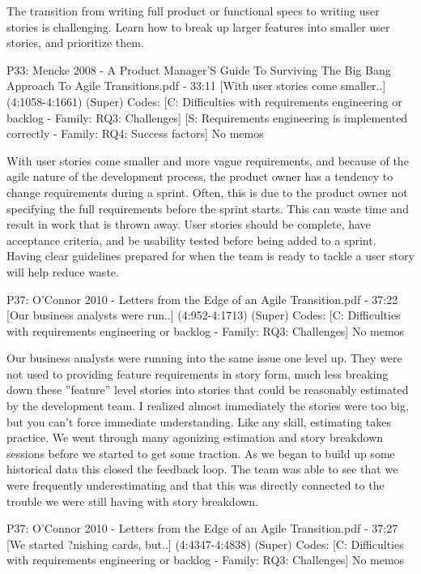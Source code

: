 \documentclass[preprint,authoryear,12pt]{elsarticle}
\begin{document}
The transition from writing full 
product or functional specs to writing user 
stories is challenging. Learn how to break up 
larger features into smaller user stories, and 
prioritize them.


P33: Mencke 2008 - A Product Manager'S Guide To Surviving The Big Bang Approach To Agile Transitions.pdf - 33:11 [With user stories come smaller..]  (4:1058-4:1661)   (Super)
Codes:	[C: Difficulties with requirements engineering or backlog - Family: RQ3: Challenges] [S: Requirements engineering is implemented correctly - Family: RQ4: Success factors] 
No memos

With user stories come smaller and more 
vague requirements, and because of the agile 
nature of the development process, the 
product owner has a tendency to change 
requirements during a sprint. Often, this is 
due to the product owner not specifying the 
full requirements before the sprint starts. 
This can waste  time and result in work that 
is thrown away. User stories should be 
complete, have acceptance criteria, and be 
usability tested before being added to a 
sprint. Having clear guidelines prepared for 
when the team is ready to tackle a user story 
will help reduce waste.


P37: O'Connor 2010 - Letters from the Edge of an Agile Transition.pdf - 37:22 [Our business analysts were run..]  (4:952-4:1713)   (Super)
Codes:	[C: Difficulties with requirements engineering or backlog - Family: RQ3: Challenges] 
No memos

Our business analysts were running into
the same issue one level up. They were not used to providing
feature requirements in story form, much less breaking down
these ”feature” level stories into stories that could be reasonably estimated by the development team. I realized almost
immediately the stories were too big, but you can’t force immediate understanding. Like any skill, estimating takes practice. We went through many agonizing estimation and story
breakdown sessions before we started to get some traction.
As we began to build up some historical data this closed the
feedback loop. The team was able to see that we were frequently underestimating and that this was directly connected
to the trouble we were still having with story breakdown.


P37: O'Connor 2010 - Letters from the Edge of an Agile Transition.pdf - 37:27 [We started ?nishing cards, but..]  (4:4347-4:4838)   (Super)
Codes:	[C: Difficulties with requirements engineering or backlog - Family: RQ3: Challenges] 
No memos
\end{document}
